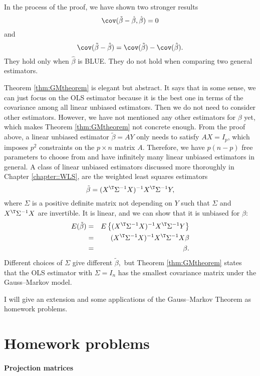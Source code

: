 In the process of the proof, we have shown two stronger results
$$
\cov(\tilde{\beta} - \hat{\beta}, \hat{\beta}) = 0
$$
and
$$
\cov(\tilde{\beta} - \hat{\beta})  =  \cov(\tilde{\beta})-\cov(\hat{\beta}).
$$
They hold only when $\hat{\beta}$ is BLUE. They do not hold when comparing two general estimators. 


Theorem \ref{thm:GMtheorem} is elegant but abstract. It says that
in some sense, we can just focus on the OLS estimator because it is
the best one in terms of the covariance among all linear unbiased estimators. Then
we do not need to consider other estimators. However, we have not
mentioned any other estimators for $\beta$ yet, which makes Theorem
\ref{thm:GMtheorem} not concrete enough. From the proof above, a
linear unbiased estimator $\tilde{\beta}=AY$ only needs to satisfy
$AX=I_{p}$, which imposes $p^{2}$ constraints on the $p\times n$
matrix $A$. Therefore, we have $p(n-p)$ free parameters to choose
from and have infinitely many linear unbiased estimators in general. A
class of linear unbiased estimators discussed more thoroughly in Chapter \ref{chapter::WLS}, are the weighted least squares estimators
\[
\tilde{\beta}=(X^{\T}\Sigma^{-1}X)^{-1}X^{\T}\Sigma^{-1}Y,
\]
 where $\Sigma$ is a positive definite matrix not depending on $Y$
such that $\Sigma$ and $X^{\T}\Sigma^{-1}X$ are invertible. It is linear, and we
can show that it is unbiased for $\beta$:
\begin{eqnarray*}
E(\tilde{\beta}) 
&=& E\left\{ (X^{\T}\Sigma^{-1}X)^{-1}X^{\T}\Sigma^{-1}Y\right\} \\
&=& (X^{\T}\Sigma^{-1}X)^{-1}X^{\T}\Sigma^{-1}X\beta \\
&=&\beta.
\end{eqnarray*}
Different choices of $\Sigma$ give different $\tilde{\beta},$ but
Theorem \ref{thm:GMtheorem} states that the OLS estimator with $\Sigma=I_{n}$
has the smallest covariance matrix under the Gauss--Markov model. 

I will give an extension and some applications of the Gauss--Markov Theorem as homework problems. 



 

\section{Homework problems}

\paragraph{Projection matrices}\label{hw::gauss-markov-projectionm}

